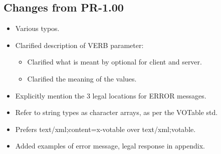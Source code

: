 \documentclass[11pt,a4paper]{ivoa}
\begin{document}
\subsection{Changes from PR-1.00}
\begin{itemize}[noitemsep]
	\item Various typos.
	\item Clarified description of VERB parameter:
	\begin{itemize}[noitemsep]
		\item Clarified what is meant by optional for client and server.
		\item Clarified the meaning of the values.
	\end{itemize}
	\item Explicitly mention the 3 legal locations for ERROR messages.
	\item Refer to string types as character arrays, as per the VOTable std.
	\item Prefers text/xml;content=x-votable over text/xml;votable.
	\item Added examples of error message, legal response in appendix.
\end{itemize}
\end{document}
